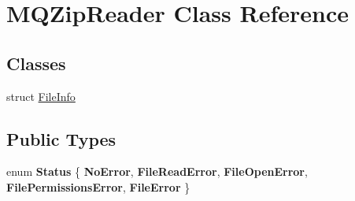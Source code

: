 \hypertarget{class_m_q_zip_reader}{}\section{M\+Q\+Zip\+Reader Class Reference}
\label{class_m_q_zip_reader}
\subsection*{Classes}
\begin{DoxyCompactItemize}
\item 
struct \hyperlink{struct_m_q_zip_reader_1_1_file_info}{File\+Info}
\end{DoxyCompactItemize}
\subsection*{Public Types}
\begin{DoxyCompactItemize}
\item 
\mbox{\label{class_m_q_zip_reader_a60fbc02d0096c9a7de57fc28011a6850}} 
enum {\bfseries Status} \{ \newline
{\bfseries No\+Error}, 
{\bfseries File\+Read\+Error}, 
{\bfseries File\+Open\+Error}, 
{\bfseries File\+Permissions\+Error}, 
\newline
{\bfseries File\+Error}
 \}
\end{DoxyCompactItemize}
